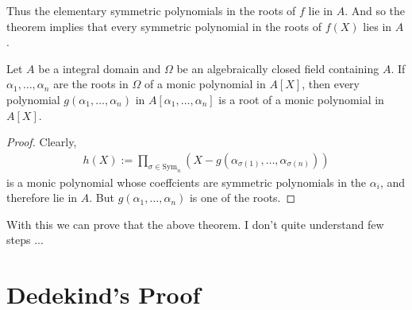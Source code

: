 Thus the elementary symmetric polynomials in the roots of \(f\) lie in \(A\). And so the theorem implies that every symmetric polynomial in the roots of \(f(X)\) lies in \(A\).
\begin{thmbox}
    \begin{proposition}
        Let \(A\) be a integral domain and \(\Omega\) be an algebraically closed field containing \(A\). If \(\alpha_1, \ldots, \alpha_n\) are the roots in \(\Omega\) of a monic polynomial in \(A[X]\), then every polynomial \(g(\alpha_1, \ldots, \alpha_n)\) in \(A[\alpha_1, \ldots, \alpha_n]\) is a root of a monic polynomial in \(A[X]\).
    \end{proposition}
\end{thmbox}
\begin{proof}
    Clearly,
    \begin{align*}
        h(X) := \prod_{\sigma \in \mathrm{Sym}_n} (X -  g(\alpha_{\sigma(1)}, \ldots, \alpha_{\sigma(n  )}))
    \end{align*}
    is a monic polynomial whose coeffcients are symmetric polynomials in the \(\alpha_i\), and therefore lie in \(A\). But \(g(\alpha_1, \ldots, \alpha_n)\) is one of the roots.
\end{proof}
With this we can prove that the above theorem. I don't quite understand few steps ...

\section*{Dedekind's Proof}

